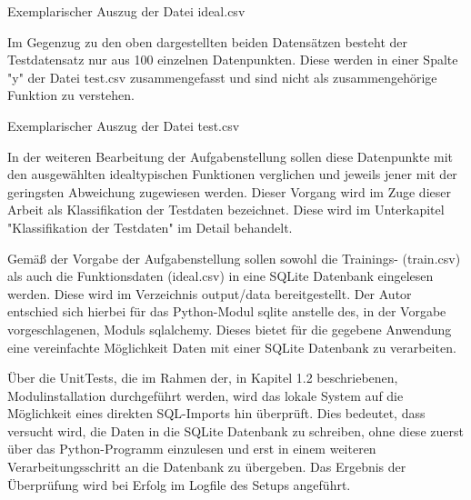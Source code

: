 \begin{table}[H]
\small
\centering
{}
\caption{Exemplarischer Auszug der Datei ideal.csv}
\label{tab:Exemplarischer Auszug aus ideal.csv}
\end{table} 

Im Gegenzug zu den oben dargestellten beiden Datensätzen besteht der Testdatensatz nur aus 100 einzelnen Datenpunkten. Diese werden in einer Spalte "y" der Datei test.csv zusammengefasst und sind nicht als zusammengehörige Funktion zu verstehen. 

\begin{table}[H]
\small
\centering
{}
\caption{Exemplarischer Auszug der Datei test.csv}
\label{tab:Exemplarischer Auszug aus test.csv}
\end{table} 

In der weiteren Bearbeitung der Aufgabenstellung sollen diese Datenpunkte mit den ausgewählten idealtypischen Funktionen verglichen und jeweils jener mit der geringsten Abweichung zugewiesen werden. Dieser Vorgang wird im Zuge dieser Arbeit als Klassifikation der Testdaten bezeichnet. Diese wird im Unterkapitel "Klassifikation der Testdaten" im Detail behandelt.

Gemäß der Vorgabe der Aufgabenstellung sollen sowohl die Trainings- (train.csv) als auch die Funktionsdaten (ideal.csv) in eine SQLite Datenbank eingelesen werden. Diese wird im Verzeichnis output/data bereitgestellt. Der Autor entschied sich hierbei für das Python-Modul sqlite anstelle des, in der Vorgabe vorgeschlagenen, Moduls sqlalchemy. Dieses bietet für die gegebene Anwendung eine vereinfachte Möglichkeit Daten mit einer SQLite Datenbank zu verarbeiten.

Über die UnitTests, die im Rahmen der, in Kapitel 1.2 beschriebenen, Modulinstallation durchgeführt werden, wird das lokale System auf die Möglichkeit eines direkten SQL-Imports hin überprüft. Dies bedeutet, dass versucht wird, die Daten in die SQLite Datenbank zu schreiben, ohne diese zuerst über das Python-Programm einzulesen und erst in einem weiteren Verarbeitungsschritt an die Datenbank zu übergeben. Das Ergebnis der Überprüfung wird bei Erfolg im Logfile des Setups angeführt. 

